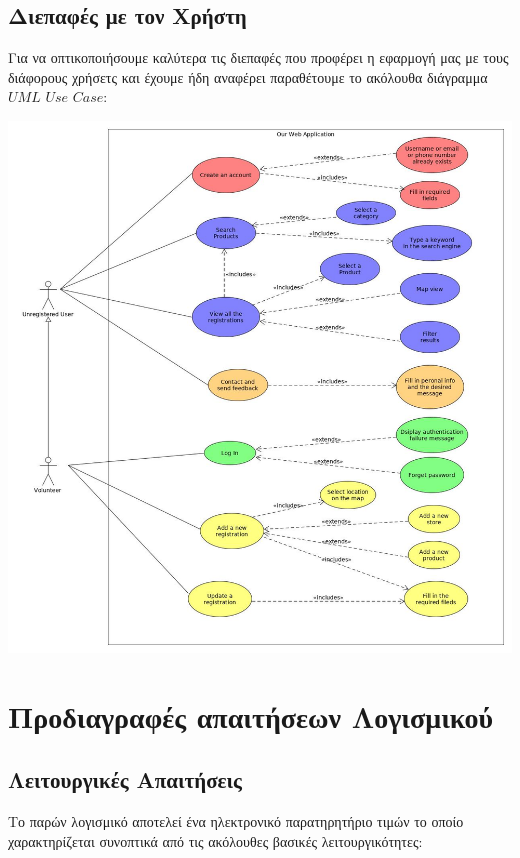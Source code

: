 \documentclass[12pt]{article}
\begin{document}
\subsection{Διεπαφές με τον Χρήστη}

Για να οπτικοποιήσουμε καλύτερα τις διεπαφές που προφέρει η εφαρμογή μας με τους διάφορους χρήσετς και έχουμε ήδη αναφέρει παραθέτουμε το ακόλουθα διάγραμμα $UML$ $Use$ $Case$:

\begin{center}

\includegraphics[scale=0.35]{UML/useCaseDiagram.jpg}

\end{center}

\section{Προδιαγραφές απαιτήσεων Λογισμικού}

\subsection{Λειτουργικές Απαιτήσεις}

Το παρών λογισμικό αποτελεί ένα ηλεκτρονικό παρατηρητήριο τιμών το οποίο χαρακτηρίζεται συνοπτικά από τις ακόλουθες βασικές λειτουργικότητες:
\end{document}
